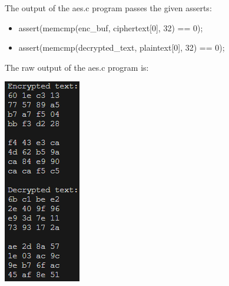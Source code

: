 The output of the aes.c program passes the given asserts:
\begin{itemize}
    \item assert(memcmp(enc\_buf, ciphertext[0], 32) == 0);
	\item assert(memcmp(decrypted\_text, plaintext[0], 32) == 0);
\end{itemize}

The raw output of the aes.c program is:

\graphicspath{{./}}
\includegraphics*[scale=1]{aes_output.png}